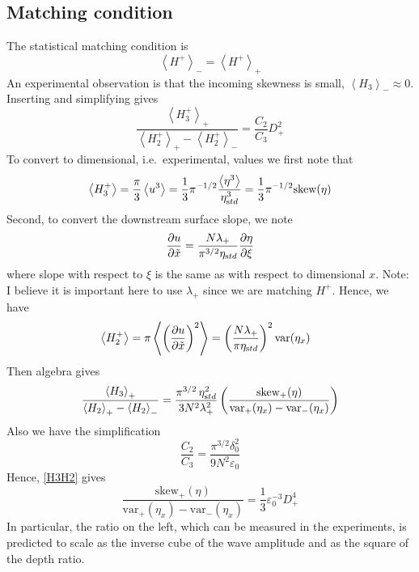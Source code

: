 \documentclass[11pt]{article}
\newcommand{\pd}[2]    { \frac{\partial #1} {\partial #2} }
\newcommand{\mean}[1]{\left< #1 \right>}
\newcommand{\eps}{\varepsilon}
\newcommand{\etastd}{\eta_{\text std}}
\newcommand{\lam}{\lambda}
\newcommand{\lamdn}{\lam_{+}}
\newcommand{\lamfac}{N}
\newcommand{\drat}{D}
\newcommand{\dratdn}{\drat_+}
\newcommand{\skw}{\text{skew}}
\newcommand{\skwdn}{\skw_+}
\newcommand{\var}{\text{var}}
\newcommand{\varup}{\var_-}
\newcommand{\vardn}{\var_+}
\newcommand{\epsup}{\eps_0}
\newcommand{\delup}{\delta_0}
\newcommand{\Ham}{H}
\newcommand{\Hdn}{\Ham^{+}}
\newcommand{\meanup}[1]{\mean{#1}_{-}}
\newcommand{\meandn}[1]{\mean{#1}_{+}}
\begin{document}
\subsection{Matching condition}

The statistical matching condition is
\begin{equation}
\meanup{\Hdn} = \meandn{\Hdn}
\end{equation}
An experimental observation is that the incoming skewness is small, $\meanup{H_3} \approx 0$. Inserting and simplifying gives
\begin{equation}
\label{H3H2}
\frac{\meandn{H_3^+}} {\meandn{H_2^+} - \meanup{H_2^+}} = \frac{C_2}{C_3} \dratdn^2
\end{equation}
To convert to dimensional, i.e.~experimental, values we first note that
\begin{align}
\mean{H_3^+} = \frac{\pi}{3} \mean{u^3} = 
\frac{1}{3} \pi^{-1/2} \frac{\mean{\eta^3}}{\etastd^3} = \frac{1}{3} \pi^{-1/2} \skw(\eta)
\end{align}
Second, to convert the downstream surface slope, we note
\begin{align}
\pd{u}{\tilde{x}} = \frac{\lamfac \lamdn}{\pi^{3/2} \etastd} \pd{\eta}{\xi}
\end{align}
where slope with respect to $\xi$ is the same as with respect to dimensional $x$.
Note: I believe it is important here to use $\lamdn$ since we are matching $\Hdn$.
Hence, we have
\begin{align}
&\mean{H_2^+} = \pi \mean{ \left( \pd{u}{\tilde{x}} \right)^2} = 
\left( \frac{\lamfac \lamdn}{\pi \etastd} \right)^2 \var(\eta_x)
\end{align}
%
Then algebra gives
\begin{equation}
\frac{\meandn{H_3}} {\meandn{H_2} - \meanup{H_2}} = 
\frac{\pi^{3/2} \, \etastd^2} {3 \lamfac^2 \lamdn^2} 
\left( \frac{\skwdn(\eta)} { \vardn(\eta_x) - \varup(\eta_x)} \right)
\end{equation}
Also we have the simplification
\begin{equation}
\frac{C_2}{C_3} = \frac{\pi^{3/2} \delup^2}{9 \lamfac^2 \epsup}
\end{equation}
Hence, \eqref{H3H2} gives
\begin{equation}
\frac{\skwdn(\eta)} {\vardn(\eta_x) - \varup(\eta_x)} = \frac{1}{3} \epsup^{-3} \dratdn^4
\end{equation}
In particular, the ratio on the left, which can be measured in the experiments, is predicted to scale as the inverse cube of the wave amplitude and as the square of the depth ratio.
\end{document}
